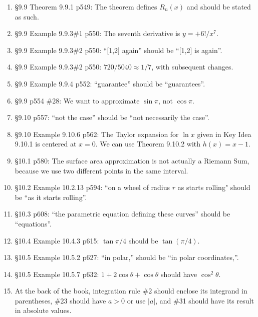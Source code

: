 \documentclass{amsart}
\begin{document}
\begin{enumerate}
\item \S9.9 Theorem 9.9.1 p549: The theorem defines $R_n(x)$ and should be stated as such.
\item \S9.9 Example 9.9.3\#1 p550: The seventh derivative is $y=+6!/x^7$.
\item \S9.9 Example 9.9.3\#2 p550: ``[1,2] again'' should be ``[1,2] is again''.
\item \S9.9 Example 9.9.3\#2 p550: $720/5040\approx1/7$, with subsequent changes.
\item \S9.9 Example 9.9.4 p552: ``guarantee'' should be ``guarantees''.
\item \S9.9 p554 \#28: We want to approximate $\sin\pi$, not $\cos\pi$.
\item \S9.10 p557: ``not the case'' should be ``not necessarily the case''.
\item \S9.10 Example 9.10.6 p562: The Taylor expansion for $\ln x$ given in Key Idea 9.10.1 is centered at $x=0$.  We can use Theorem 9.10.2 with $h(x)=x-1$.
\item \S10.1 p580: The surface area approximation is not actually a Riemann Sum, because we use two different points in the same interval.
\item \S10.2 Example 10.2.13 p594: ``on a wheel of radius $r$ as starts rolling" should be ``as it starts rolling''.
\item \S10.3 p608: ``the parametric equation defining these curves'' should be ``equations''.
\item \S10.4 Example 10.4.3 p615: $\tan\pi/4$ should be $\tan(\pi/4)$.
\item \S10.5 Example 10.5.2 p627: ``in polar,'' should be ``in polar coordinates,''.
\item \S10.5 Example 10.5.7 p632: $1+2\cos\theta+\cos\theta$ should have $\cos^2\theta$.
\item At the back of the book, integration rule \#2 should enclose its integrand in parentheses, \#23 should have $a>0$ or use $|a|$, and \#31 should have its result in absolute values.
\label{2021-06II}
\end{enumerate}

\clearpage
\end{document}
